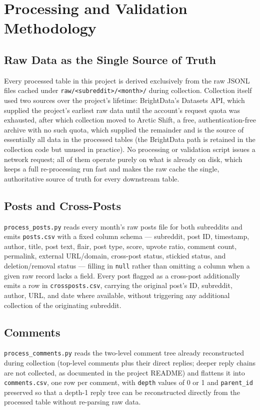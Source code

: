 \documentclass[12pt]{article}
\begin{document}
\section{Processing and Validation Methodology}

\subsection{Raw Data as the Single Source of Truth}
Every processed table in this project is derived exclusively from the raw JSONL files cached
under \texttt{raw/<subreddit>/<month>/} during collection. Collection itself used two sources
over the project's lifetime: BrightData's Datasets API, which supplied the project's earliest
raw data until the account's request quota was exhausted, after which collection moved to Arctic
Shift, a free, authentication-free archive with no such quota, which supplied the remainder and
is the source of essentially all data in the processed tables (the BrightData path is retained
in the collection code but unused in practice). No processing or validation script issues a
network request; all of them operate purely on what is already on disk, which keeps a full
re-processing run fast and makes the raw cache the single, authoritative source of truth for
every downstream table.

\subsection{Posts and Cross-Posts}
\texttt{process\_posts.py} reads every month's raw posts file for both subreddits and emits
\texttt{posts.csv} with a fixed column schema — subreddit, post ID, timestamp, author, title, post
text, flair, post type, score, upvote ratio, comment count, permalink, external URL/domain,
cross-post status, stickied status, and deletion/removal status — filling in \texttt{null} rather
than omitting a column when a given raw record lacks a field. Every post flagged as a cross-post
additionally emits a row in \texttt{crossposts.csv}, carrying the original post's ID, subreddit,
author, URL, and date where available, without triggering any additional collection of the
originating subreddit.

\subsection{Comments}
\texttt{process\_comments.py} reads the two-level comment tree already reconstructed during
collection (top-level comments plus their direct replies; deeper reply chains are not collected,
as documented in the project README) and flattens it into \texttt{comments.csv}, one row per
comment, with \texttt{depth} values of 0 or 1 and \texttt{parent\_id} preserved so that a
depth-1 reply tree can be reconstructed directly from the processed table without re-parsing raw
data.
\end{document}
